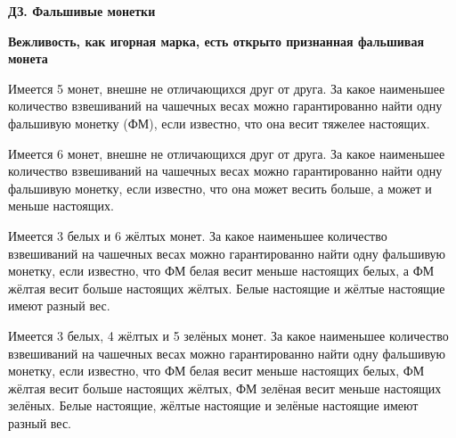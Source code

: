 \centerline{\bf \Huge ДЗ. Фальшивые монетки}
\centerline{\bf \Huge }

\begin{flushright}
        \scriptsize{\textbf{Вежливость, как игорная марка, есть открыто признанная фальшивая монета}}
\end{flushright}

 Имеется 5 монет, внешне не отличающихся друг от друга. За какое наименьшее количество взвешиваний на чашечных весах можно гарантированно найти одну фальшивую монетку (ФМ), если известно, что она весит тяжелее настоящих.

 Имеется 6 монет, внешне не отличающихся друг от друга. За какое наименьшее количество взвешиваний на чашечных весах можно гарантированно найти одну фальшивую монетку, если известно, что она может весить больше, а может и меньше настоящих.

 Имеется 3 белых и 6 жёлтых монет. За какое наименьшее количество взвешиваний на чашечных весах можно гарантированно найти одну фальшивую монетку, если известно, что ФМ белая весит меньше настоящих белых, а ФМ жёлтая весит больше настоящих жёлтых. Белые настоящие и жёлтые настоящие имеют разный вес.

 Имеется 3 белых, 4 жёлтых и 5 зелёных монет. За какое наименьшее количество взвешиваний на чашечных весах можно гарантированно найти одну фальшивую монетку, если известно, что ФМ белая весит меньше настоящих белых, ФМ жёлтая весит больше настоящих жёлтых, ФМ зелёная весит меньше настоящих зелёных. Белые настоящие, жёлтые настоящие и зелёные настоящие имеют разный вес.

